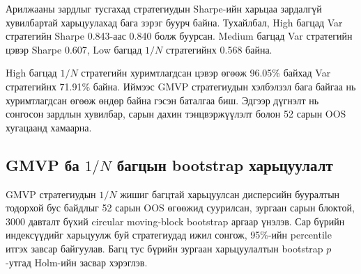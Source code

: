 Арилжааны зардлыг тусгахад стратегиудын
Sharpe-ийн харьцаа зардалгүй
хувилбартай харьцуулахад бага зэрэг
буурч байна. Тухайлбал, High багцад
Var стратегийн Sharpe 0.843-аас
0.840 болж буурсан. Medium багцад
Var стратегийн цэвэр Sharpe 0.607,
Low багцад $1/N$ стратегийнх 0.568 байна.

High багцад $1/N$ стратегийн
хуримтлагдсан цэвэр өгөөж 96.05\%
байхад Var стратегийнх 71.91\% байна.
Иймээс GMVP стратегиудын хэлбэлзэл
бага байгаа нь хуримтлагдсан өгөөж
өндөр байна гэсэн баталгаа биш.
Эдгээр дүгнэлт нь сонгосон зардлын
хувилбар, сарын дахин тэнцвэржүүлэлт
болон 52 сарын OOS хугацаанд хамаарна.

\subsection{GMVP ба $1/N$ багцын bootstrap харьцуулалт}
\label{subsec:bootstrap_equal_weight_results}

GMVP стратегиудын $1/N$ жишиг багцтай
харьцуулсан дисперсийн бууралтын
тодорхой бус байдлыг 52 сарын OOS
өгөөжид суурилсан, зургаан сарын
блоктой, 3000 давталт бүхий circular
moving-block bootstrap аргаар үнэлэв.
Сар бүрийн индексүүдийг харьцуулж буй
стратегиудад ижил сонгож,
95\%-ийн percentile итгэх завсар
байгуулав. Багц тус бүрийн зургаан
харьцуулалтын bootstrap $p$-утгад
Holm-ийн засвар хэрэглэв.

